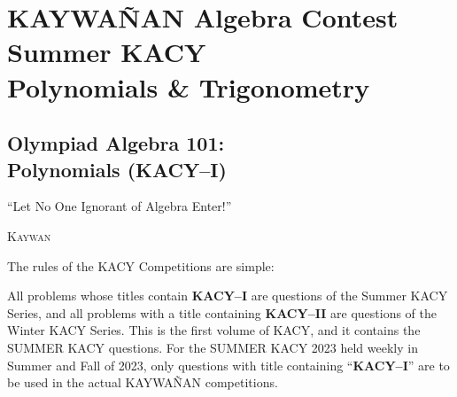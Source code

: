 \documentclass[12pt,a4paper]{memoir}
\theoremstyle{definition}
\begin{document}







\part{KAYWAÑAN Algebra Contest\\ Summer KACY \\ Polynomials \& Trigonometry}\label{part:VolI}
\chapter{Olympiad Algebra 101:\\ Polynomials (KACY--I)}\label{ch:POLY}
% 

\begin{tcolorbox}
	\begin{displayquote}
		``Let No One Ignorant of Algebra Enter!''
		\begin{flushright}
			\LARGE \textsc{Kaywan}
		\end{flushright}
	\end{displayquote}
\end{tcolorbox}


The rules of the KACY Competitions are simple: 
\begin{idea}
	\begin{tasks}
		\task All problems whose titles contain \textbf{KACY--I} are questions of the Summer KACY Series, and all problems with a title containing \textbf{KACY--II} are questions of the Winter KACY Series.
		\task This is the first volume of KACY, and it contains the SUMMER KACY questions. For the SUMMER KACY 2023 held weekly in Summer and Fall of 2023, only questions with title containing ``\textbf{KACY--I}'' are to be used in the actual KAYWAÑAN competitions.
	\end{tasks}
\end{idea}

\vspace{0.5em}
\end{document}
